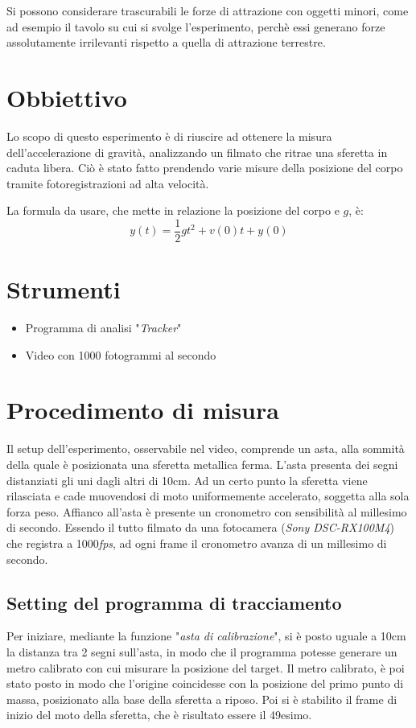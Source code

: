 \documentclass[12pt, a4paper]{article}
\begin{document}
Si possono considerare trascurabili le forze di attrazione con oggetti minori, come ad esempio il tavolo su cui si svolge l'esperimento, perchè essi generano forze assolutamente irrilevanti rispetto a quella di attrazione terrestre.

\section{Obbiettivo}
\label{sezione obbiettivi}
Lo scopo di questo esperimento è di riuscire ad ottenere la misura dell'accelerazione di gravità, analizzando un filmato che ritrae una sferetta in caduta libera. 
Ciò è stato fatto prendendo varie misure della posizione del corpo tramite fotoregistrazioni ad alta velocità. 

La formula da usare, che mette in relazione la posizione del corpo e $g$, è:
\begin{equation*}
    y(t) = \frac{1}{2}gt^2+ v(0)t+y(0)
\end{equation*}


\section{Strumenti}
\begin{itemize}
\setlength\itemsep{0mm}
    \item Programma di analisi "\textit{Tracker}"
    \item Video con 1000 fotogrammi al secondo
\end{itemize}

\section{Procedimento di misura}
Il setup dell'esperimento, osservabile nel video, comprende un asta, alla sommità della quale è posizionata una sferetta metallica ferma. L'asta presenta dei segni distanziati gli uni dagli altri di 10cm. 
Ad un certo punto la sferetta viene rilasciata e cade muovendosi di moto uniformemente accelerato, soggetta alla sola forza peso. Affianco all'asta è presente un cronometro con sensibilità al millesimo di secondo. 
Essendo il tutto filmato da una fotocamera (\textit{Sony DSC-RX100M4}) che registra a 1000\textit{fps}, ad ogni frame il cronometro avanza di un millesimo di secondo.

  
\subsection{Setting del programma di tracciamento}
Per iniziare, mediante la funzione "\textit{asta di calibrazione}", si è posto uguale a 10cm la distanza tra 2 segni sull'asta, in modo che il programma potesse generare un metro calibrato con cui misurare la posizione del target. Il metro calibrato, è poi stato posto in modo che l'origine coincidesse con la posizione del primo punto di massa, posizionato alla base della sferetta a riposo. Poi si è stabilito il frame di inizio del moto della sferetta, che è risultato essere il 49esimo. 
\end{document}
